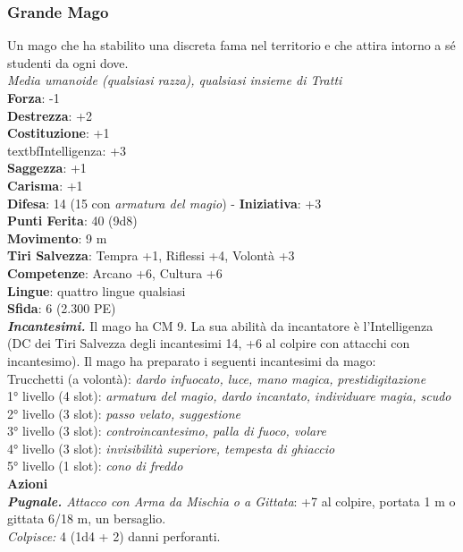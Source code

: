 \begin{multicols}{2}
\subsubsection{Grande Mago}
Un mago che ha stabilito una discreta fama nel territorio e che attira intorno a sé studenti da ogni dove.\\
\emph{Media umanoide (qualsiasi razza), qualsiasi insieme di Tratti}\\
\textbf{Forza}: -1\\
\textbf{Destrezza}: +2\\
\textbf{Costituzione}: +1\
\\textbf{Intelligenza}: +3\\
\textbf{Saggezza}: +1\\
\textbf{Carisma}: +1\\
\textbf{Difesa}: 14 (15 con \emph{armatura del magio}) - \textbf{Iniziativa}: +3\\
\textbf{Punti Ferita}: 40 (9d8)\\
\textbf{Movimento}: 9 m\\
\textbf{Tiri Salvezza}: Tempra +1, Riflessi +4, Volontà +3 \\
\textbf{Competenze}: Arcano +6, Cultura +6\\
\textbf{Lingue}: quattro lingue qualsiasi\\
\textbf{Sfida}: 6 (2.300 PE)\smallskip\\
\emph{\textbf{Incantesimi.}} Il mago ha CM 9. La sua abilità da incantatore è l'Intelligenza (DC dei Tiri Salvezza degli incantesimi 14, +6 al colpire con attacchi con incantesimo). Il mago ha preparato i seguenti incantesimi da mago:\\
Trucchetti (a volontà): \emph{dardo infuocato, luce, mano magica,} \emph{prestidigitazione}\\
1° livello (4 slot): \emph{armatura del magio, dardo incantato,} \emph{individuare magia, scudo}\\
2° livello (3 slot): \emph{passo velato, suggestione}\\
3° livello (3 slot): \emph{controincantesimo, palla di fuoco, volare}\\
4° livello (3 slot): \emph{invisibilità superiore, tempesta di ghiaccio}\\
5° livello (1 slot): \emph{cono di freddo}\\
\smallskip\textbf{Azioni}\\
\emph{\textbf{Pugnale.} Attacco con Arma da Mischia o a Gittata}: +7 al colpire, portata 1 m o gittata 6/18 m, un bersaglio.\\
\emph{Colpisce:} 4 (1d4 + 2) danni perforanti.


\end{multicols}
